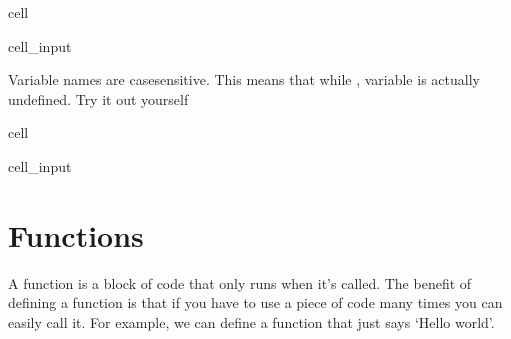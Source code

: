\documentclass[letterpaper,10pt,english]{jupyterBook}
\begin{document}
\begin{sphinxuseclass}{cell}\begin{sphinxVerbatimInput}

\begin{sphinxuseclass}{cell_input}
\begin{sphinxVerbatim}[commandchars=\\\{\}]
\end{sphinxVerbatim}

\end{sphinxuseclass}\end{sphinxVerbatimInput}

\end{sphinxuseclass}
\sphinxAtStartPar
Variable names are case\sphinxhyphen{}sensitive. This means that while , variable  is actually undefined. Try it out yourself

\begin{sphinxuseclass}{cell}\begin{sphinxVerbatimInput}

\begin{sphinxuseclass}{cell_input}
\begin{sphinxVerbatim}[commandchars=\\\{\}]
\end{sphinxVerbatim}

\end{sphinxuseclass}\end{sphinxVerbatimInput}

\end{sphinxuseclass}

\section{Functions}
\label{\detokenize{notebooks/Tutorial1_NumpySimpleITK/Tutorial1_NumpySimpleITK_student:functions}}
\sphinxAtStartPar
A function is a block of code that only runs when it’s called. The benefit of defining a function is that \sphinxhyphen{} if you have to use a piece of code many times \sphinxhyphen{} you can easily call it. For example, we can define a function that just says ‘Hello world’.
\end{document}
